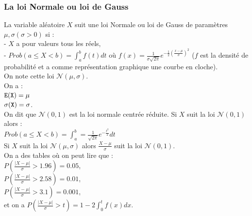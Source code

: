 \documentclass[a4paper,11pt]{book}
\begin{document}
\subsubsection{La loi Normale ou loi de Gauss}
La variable al\'eatoire $X$ suit une loi Normale ou loi de Gauss
de param\`etres $\mu,\sigma (\sigma > 0)$ si :\\
- $X$ a pour valeurs tous les r\'eels,\\
- $Prob(a \leq X<b)=\int_a^b f(t) dt$ o\`u 
$ \displaystyle f(x)=\frac{1}{\sigma\sqrt{2\pi}}e^{-\frac{1}{2}(\frac{x-\mu}{\sigma})^2}$ ($f$ est la densit\'e de probabilit\'e et a comme repr\'esentation 
graphique une courbe en cloche).\\
On note cette loi $\mathcal N(\mu,\sigma)$.\\
On a :\\
${\tt E(X)=\mu}$\\
${\tt \sigma(X)=\sigma}$.\\
On dit que $\mathcal N(0,1)$ est la loi normale centr\'ee r\'eduite.
 Si $X$ suit la loi $\mathcal N(0,1)$ alors  :\\
$ Prob(a \leq X<b)=\int_a^b  =\frac{1}{\sqrt{2\pi}}e^{-\frac{t^2}{2}}dt$\\
Si $X$ suit la loi $\mathcal N(\mu,\sigma)$ alors  $\displaystyle \frac{X-\mu}{\sigma}$
 suit la loi $\mathcal N(0,1)$.\\
On a des tables o\`u  on peut lire que :\\
$\displaystyle P(\frac{|X-\mu|}{\sigma} >1.96)=0.05$,  \\
$\displaystyle P(\frac{|X-\mu|}{\sigma} >2.58)=0.01$, \\
$\displaystyle P(\frac{|X-\mu|}{\sigma} >3.1)=0.001$, \\
et on a $\displaystyle P(\frac{|X-\mu|}{\sigma}>t)=1-2\int_0^t f(x)dx$.
\end{document}
